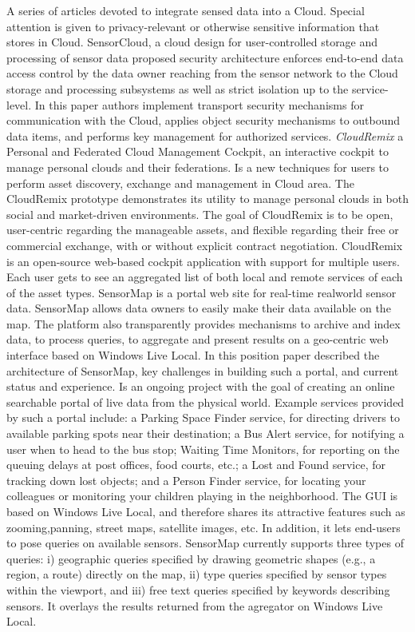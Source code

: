 \newline
	A series of articles devoted to integrate sensed data into a Cloud. Special attention is given to privacy-relevant or otherwise sensitive information that stores in Cloud. SensorCloud\cite{hummen2012cloud}, a cloud design for user-controlled storage and processing of sensor data proposed security architecture enforces end-to-end data access control by the data owner reaching from the sensor network to the Cloud storage and processing subsystems as well as strict isolation up to the service-level. In this paper authors implement transport security mechanisms for communication with the Cloud, applies object security mechanisms to outbound data items, and performs key management for authorized services. \emph{CloudRemix\cite{spillner2013personal}} a Personal and Federated Cloud Management Cockpit, an interactive cockpit to manage personal clouds and their federations. Is a new techniques for users to perform asset discovery, exchange and management in Cloud area. The CloudRemix prototype demonstrates its utility to manage personal clouds in both social and market-driven environments. The goal of CloudRemix is to be open, user-centric regarding the manageable assets, and flexible regarding their free or commercial exchange, with or without explicit contract negotiation. CloudRemix is an open-source web-based cockpit application with support for multiple users. Each user gets to see an aggregated list of both local and remote services of each of the asset types.
\newline
    SensorMap\cite{nath2006challenges} is a portal web site for real-time realworld sensor data. SensorMap allows data owners to easily make their data available on the map. The platform also transparently provides mechanisms to archive and index data, to process queries, to aggregate and present results on a geo-centric web interface based on Windows Live Local. In this position paper  described the architecture of SensorMap, key challenges in building such a portal, and current status and experience. Is an ongoing project with the goal of creating an online searchable portal of live data from the physical world. Example services provided by such a portal include: a Parking Space Finder service, for directing drivers to available parking spots near their destination; a Bus Alert service, for notifying a user when to head to the bus stop; Waiting Time Monitors, for reporting on the queuing delays at post offices, food courts, etc.; a Lost and Found service, for tracking down lost objects; and a Person Finder service, for locating your colleagues or monitoring your children playing in the neighborhood. The GUI is based on Windows Live Local, and therefore shares its attractive features such as zooming,panning, street maps, satellite images, etc. In addition, it lets end-users to pose queries on available sensors. SensorMap currently supports three types of queries: i) geographic queries specified by drawing geometric shapes (e.g., a region, a route) directly on the map, ii) type queries specified by sensor types within the viewport, and iii) free text queries specified by keywords describing sensors. It overlays the results returned from the agregator on Windows Live Local.
